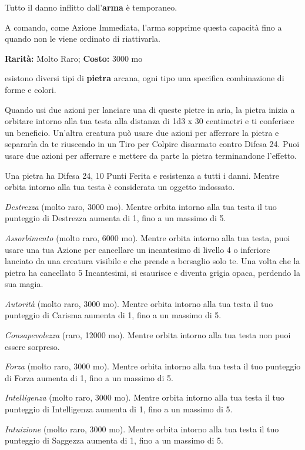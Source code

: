 \begin{multicols}{2}
Tutto il danno inflitto dall'\textbf{arma} è temporaneo.

A comando, come Azione Immediata, l'arma sopprime questa capacità fino a quando non le viene ordinato di riattivarla.


\textbf{Rarità:} Molto Raro; \textbf{Costo:} 3000 mo

esistono diversi tipi di \textbf{pietra} arcana, ogni tipo una specifica combinazione di forme e colori.

Quando usi due azioni per lanciare una di queste pietre in aria, la pietra inizia a orbitare intorno alla tua testa alla distanza di 1d3 x 30 centimetri e ti conferisce un beneficio.
Un'altra creatura può usare due azioni per afferrare la pietra e separarla da te riuscendo in un Tiro per Colpire disarmato contro Difesa 24. Puoi usare due azioni per afferrare e mettere da parte la pietra terminandone l'effetto.

Una pietra ha Difesa 24, 10 Punti Ferita e resistenza a tutti i danni. Mentre orbita intorno alla tua testa è considerata un oggetto indossato.

\emph{Destrezza} (molto raro, 3000 mo). Mentre orbita intorno alla tua testa il tuo punteggio di Destrezza aumenta di 1, fino a un massimo di 5.

\emph{Assorbimento} (molto raro, 6000 mo). Mentre orbita intorno alla tua testa, puoi usare una tua Azione per cancellare un incantesimo di livello 4 o inferiore lanciato da una creatura visibile e che prende a bersaglio solo te. Una volta che la pietra ha cancellato 5 Incantesimi, si esaurisce e diventa grigia opaca, perdendo la sua magia.

\emph{Autorità} (molto raro, 3000 mo). Mentre orbita intorno alla tua testa il tuo punteggio di Carisma aumenta di 1, fino a un massimo di 5.

\emph{Consapevolezza} (raro, 12000 mo). Mentre orbita intorno alla tua testa non puoi essere sorpreso.

\emph{Forza} (molto raro, 3000 mo). Mentre orbita intorno alla tua testa il tuo punteggio di Forza aumenta di 1, fino a un massimo di 5.

\emph{Intelligenza} (molto raro, 3000 mo). Mentre orbita intorno alla tua testa il tuo punteggio di Intelligenza aumenta di 1, fino a un massimo di 5.

\emph{Intuizione} (molto raro, 3000 mo). Mentre orbita intorno alla tua testa il tuo punteggio di Saggezza aumenta di 1, fino a un massimo di 5.


\end{multicols}
